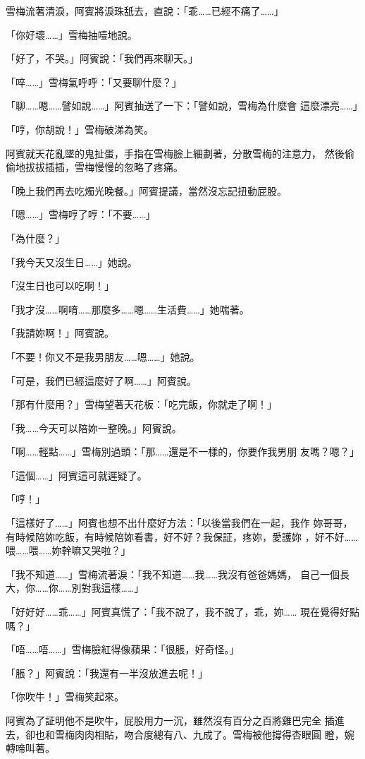 雪梅流著清淚，阿賓將淚珠舐去，直說：「乖……已經不痛了……」

「你好壞……」雪梅抽噎地說。

「好了，不哭。」阿賓說：「我們再來聊天。」

「啐……」雪梅氣呼呼：「又要聊什麼？」

「聊……嗯……譬如說……」阿賓抽送了一下：「譬如說，雪梅為什麼會
這麼漂亮……」

「哼，你胡說！」雪梅破涕為笑。

阿賓就天花亂墜的鬼扯蛋，手指在雪梅臉上細劃著，分散雪梅的注意力，
然後偷偷地拔拔插插，雪梅慢慢的忽略了疼痛。

「晚上我們再去吃燭光晚餐。」阿賓提議，當然沒忘記扭動屁股。

「嗯……」雪梅哼了哼：「不要……」

「為什麼？」

「我今天又沒生日……」她說。

「沒生日也可以吃啊！」

「我才沒……啊唷……那麼多……嗯……生活費……」她喘著。

「我請妳啊！」阿賓說。

「不要！你又不是我男朋友……嗯……」她說。

「可是，我們已經這麼好了啊……」阿賓說。

「那有什麼用？」雪梅望著天花板：「吃完飯，你就走了啊！」

「我……今天可以陪妳一整晚。」阿賓說。

「啊……輕點……」雪梅別過頭：「那……還是不一樣的，你要作我男朋
友嗎？嗯？」

「這個……」阿賓這可就遲疑了。

「哼！」

「這樣好了……」阿賓也想不出什麼好方法：「以後當我們在一起，我作
妳哥哥，有時候陪妳吃飯，有時候陪妳看書，好不好？我保証，疼妳，愛護妳
，好不好……喂……喂……妳幹嘛又哭啦？」

「我不知道……」雪梅流著淚：「我不知道……我……我沒有爸爸媽媽，
自己一個長大，你……你……別對我這樣……」

「好好好……乖……」阿賓真慌了：「我不說了，我不說了，乖，妳……
現在覺得好點嗎？」

「唔……唔……」雪梅臉紅得像蘋果：「很脹，好奇怪。」

「脹？」阿賓說：「我還有一半沒放進去呢！」

「你吹牛！」雪梅笑起來。

阿賓為了証明他不是吹牛，屁股用力一沉，雖然沒有百分之百將雞巴完全
插進去，卻也和雪梅肉肉相貼，吻合度總有八、九成了。雪梅被他撐得杏眼圓
瞪，婉轉啼叫著。

